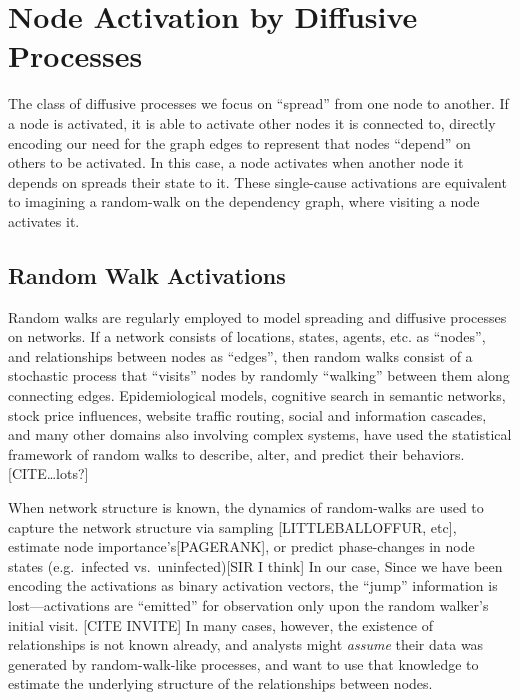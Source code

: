 \documentclass[%
	12pt,
		oneside,
		letterpaper
]{book}
\begin{document}
\section{Node Activation by Diffusive
Processes}\label{node-activation-by-diffusive-processes}

The class of diffusive processes we focus on ``spread'' from one node to
another. If a node is activated, it is able to activate other nodes it
is connected to, directly encoding our need for the graph edges to
represent that nodes ``depend'' on others to be activated. In this case,
a node activates when another node it depends on spreads their state to
it. These single-cause activations are equivalent to imagining a
random-walk on the dependency graph, where visiting a node activates it.

\subsection{Random Walk Activations}\label{random-walk-activations}

Random walks are regularly employed to model spreading and diffusive
processes on networks. If a network consists of locations, states,
agents, etc. as ``nodes'', and relationships between nodes as ``edges'',
then random walks consist of a stochastic process that ``visits'' nodes
by randomly ``walking'' between them along connecting edges.
Epidemiological models, cognitive search in semantic networks, stock
price influences, website traffic routing, social and information
cascades, and many other domains also involving complex systems, have
used the statistical framework of random walks to describe, alter, and
predict their behaviors. {[}CITE\ldots lots?{]}

When network structure is known, the dynamics of random-walks are used
to capture the network structure via sampling {[}LITTLEBALLOFFUR,
etc{]}, estimate node importance's{[}PAGERANK{]}, or predict
phase-changes in node states (e.g.~infected vs.~uninfected){[}SIR I
think{]} In our case, Since we have been encoding the activations as
binary activation vectors, the ``jump'' information is
lost---activations are ``emitted'' for observation only upon the random
walker's initial visit. {[}CITE INVITE{]} In many cases, however, the
existence of relationships is not known already, and analysts might
\emph{assume} their data was generated by random-walk-like processes,
and want to use that knowledge to estimate the underlying structure of
the relationships between nodes.
\end{document}

